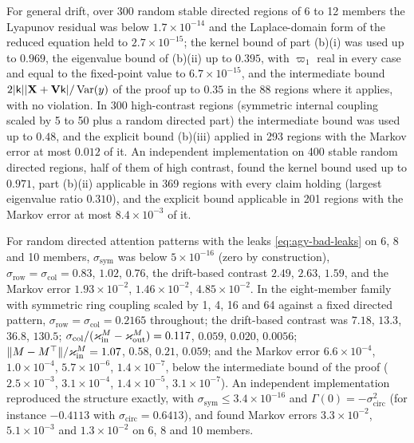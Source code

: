 \begin{numcheck}
For general drift, over 300 random stable directed regions of 6 to 12 members the Lyapunov residual was below $1.7\times10^{-14}$ and the Laplace-domain form of the reduced equation held to $2.7\times10^{-15}$; the kernel bound of part (b)(i) was used up to $0.969$, the eigenvalue bound of (b)(ii) up to $0.395$, with $\varpi_1$ real in every case and equal to the fixed-point value to $6.7\times10^{-15}$, and the intermediate bound $2\lvert\mathsf k\rvert\lvert\mathbf X+\mathbf V\mathsf k\rvert/\operatorname{Var}(y)$ of the proof up to $0.35$ in the 88 regions where it applies, with no violation. In 300 high-contrast regions (symmetric internal coupling scaled by 5 to 50 plus a random directed part) the intermediate bound was used up to $0.48$, and the explicit bound (b)(iii) applied in 293 regions with the Markov error at most $0.012$ of it. An independent implementation on 400 stable random directed regions, half of them of high contrast, found the kernel bound used up to $0.971$, part (b)(ii) applicable in 369 regions with every claim holding (largest eigenvalue ratio $0.310$), and the explicit bound applicable in 201 regions with the Markov error at most $8.4\times10^{-3}$ of it.
\end{numcheck}

\begin{numcheck}\label{chk:agy-symmetric-dispersion}
For random directed attention patterns with the leaks \eqref{eq:agy-bad-leaks} on 6, 8 and 10 members, $\sigma_{\mathrm{sym}}$ was below $5\times10^{-16}$ (zero by construction), $\sigma_{\mathrm{row}}=\sigma_{\mathrm{col}}=0.83$, $1.02$, $0.76$, the drift-based contrast $2.49$, $2.63$, $1.59$, and the Markov error $1.93\times10^{-2}$, $1.46\times10^{-2}$, $4.85\times10^{-2}$. In the eight-member family with symmetric ring coupling scaled by 1, 4, 16 and 64 against a fixed directed pattern, $\sigma_{\mathrm{row}}=\sigma_{\mathrm{col}}=0.2165$ throughout; the drift-based contrast was $7.18$, $13.3$, $36.8$, $130.5$; $\sigma_{\mathrm{col}}/(\varkappa_{\mathrm{in}}^M-\varkappa_{\mathrm{out}}^M)=0.117$, $0.059$, $0.020$, $0.0056$; $\Vert M-M^\top\Vert/\varkappa_{\mathrm{in}}^M=1.07$, $0.58$, $0.21$, $0.059$; and the Markov error $6.6\times10^{-4}$, $1.0\times10^{-4}$, $5.7\times10^{-6}$, $1.4\times10^{-7}$, below the intermediate bound of the proof ($2.5\times10^{-3}$, $3.1\times10^{-4}$, $1.4\times10^{-5}$, $3.1\times10^{-7}$). An independent implementation reproduced the structure exactly, with $\sigma_{\mathrm{sym}}\le3.4\times10^{-16}$ and $\Gamma(0)=-\sigma_{\mathrm{circ}}^2$ (for instance $-0.4113$ with $\sigma_{\mathrm{circ}}=0.6413$), and found Markov errors $3.3\times10^{-2}$, $5.1\times10^{-3}$ and $1.3\times10^{-2}$ on 6, 8 and 10 members.
\end{numcheck}

